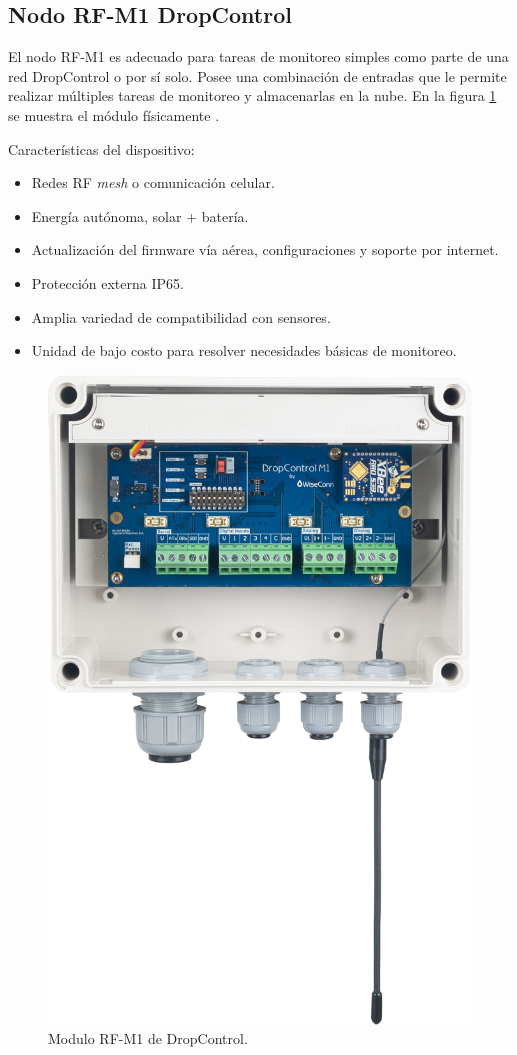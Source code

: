 \vspace{1cm}

\subsection{Nodo RF-M1 DropControl}

El nodo RF-M1 es adecuado para tareas de monitoreo simples como parte de una red DropControl o por sí solo. Posee una combinación de entradas que le permite realizar múltiples tareas de monitoreo y almacenarlas en la nube. En la figura \ref{fig:Modulo-Dropcontrol} se muestra el módulo físicamente \citep{ModuloAgricultureDos}.

Características del dispositivo: 
\begin{itemize}
  \item Redes RF \textit{mesh} o comunicación celular.
  \item Energía autónoma, solar + batería.
  \item Actualización del firmware vía aérea, configuraciones y soporte por internet.
  \item Protección externa IP65.
  \item Amplia variedad de compatibilidad con sensores.
  \item Unidad de bajo costo para resolver necesidades básicas de monitoreo. 
\end{itemize}

\begin{figure}[htbp]
	\centering
	\includegraphics[width=.3\textwidth]{./Figures/modulo_dropcontrol.png}
	\caption{Modulo RF-M1 de DropControl.}
	\label{fig:Modulo-Dropcontrol}
\end{figure}

\vspace{1cm}
\vspace{30cm}

